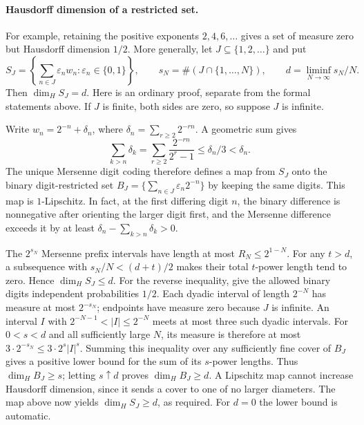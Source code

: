 \documentclass[11pt]{article}
\theoremstyle{plain}
\theoremstyle{definition}
\theoremstyle{remark}
\begin{document}
\paragraph{Hausdorff dimension of a restricted set.}
For example, retaining the positive exponents $2,4,6,\ldots$ gives
a set of measure zero but Hausdorff dimension $1/2$.  More generally,
let $J\subseteq\{1,2,\ldots\}$ and put
\[
 S_J=\left\{\sum_{n\in J}\varepsilon_nw_n:
                  \varepsilon_n\in\{0,1\}\right\},\qquad
 s_N=\#(J\cap\{1,\ldots,N\}),\qquad
 d=\liminf_{N\to\infty}s_N/N.
\]
Then $\dim_H S_J=d$.  Here is an ordinary proof, separate from the
formal statements above.  If $J$ is finite, both sides are zero,
so suppose $J$ is infinite.

Write $w_n=2^{-n}+\delta_n$, where
$\delta_n=\sum_{r\ge2}2^{-rn}$.  A geometric sum gives
\[
 \sum_{k>n}\delta_k
 =\sum_{r\ge2}\frac{2^{-rn}}{2^r-1}\le\delta_n/3<\delta_n.
\]
The unique Mersenne digit coding therefore defines a map from $S_J$
onto the binary digit-restricted set
$B_J=\{\sum_{n\in J}\varepsilon_n2^{-n}\}$ by keeping the same digits.
This map is $1$-Lipschitz.  In fact, at the first differing digit $n$,
the binary difference is nonnegative after orienting the larger digit
first, and the Mersenne difference exceeds it by at least
$\delta_n-\sum_{k>n}\delta_k>0$.

The $2^{s_N}$ Mersenne prefix intervals have length at most
$R_N\le2^{1-N}$.  For any $t>d$, a subsequence with
$s_N/N<(d+t)/2$ makes their total $t$-power length tend to zero.
Hence $\dim_H S_J\le d$.
For the reverse inequality, give the allowed binary digits independent
probabilities $1/2$.  Each dyadic interval of length $2^{-N}$ has
measure at most $2^{-s_N}$; endpoints have measure zero because $J$
is infinite.  An interval $I$ with
$2^{-N-1}<|I|\le2^{-N}$ meets at most three such dyadic intervals.
For $0<s<d$ and all sufficiently large $N$, its measure is therefore
at most $3\cdot2^{-s_N}\le3\cdot2^s|I|^s$.
Summing this inequality over any sufficiently fine cover of $B_J$
gives a positive lower bound for the sum of its $s$-power lengths.
Thus $\dim_H B_J\ge s$; letting $s\uparrow d$ proves
$\dim_H B_J\ge d$.  A Lipschitz map cannot increase Hausdorff
dimension, since it sends a cover to one of no larger diameters.
The map above now yields $\dim_H S_J\ge d$, as required.
For $d=0$ the lower bound is automatic.
\end{document}
